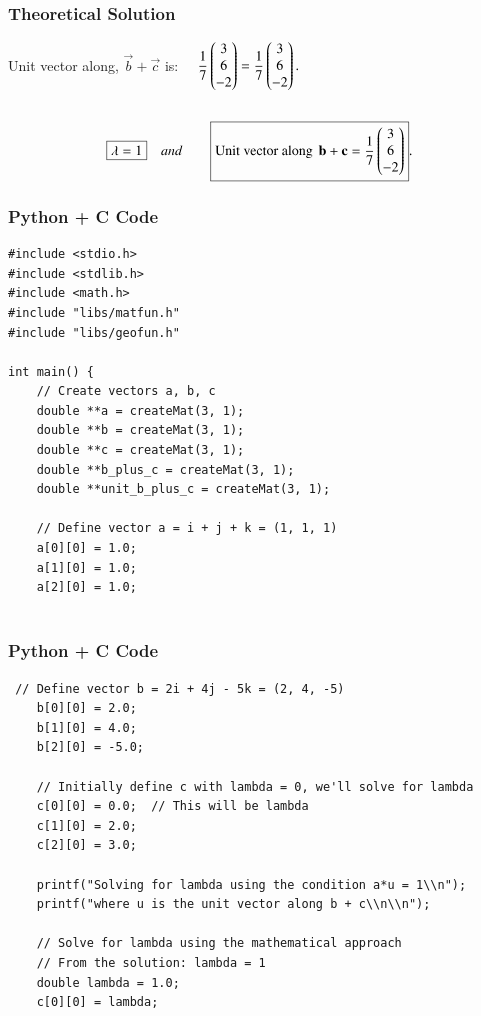 \documentclass{beamer}
\begin{document}
\begin{frame}[fragile]
    \frametitle{Theoretical Solution}

Unit vector along, $\vec{b}+\vec{c}$ is: $\quad \dfrac{1}{7}\begin{pmatrix}3\\6\\-2\end{pmatrix}
= \dfrac{1}{7}\begin{pmatrix}3\\6\\-2\end{pmatrix}.$\\\\
\bigskip
\begin{align}   
\centering
\boxed{\lambda=1} \quad and \qquad 
\boxed{\text{Unit vector along }\,\vec{b}+\vec{c}
=\dfrac{1}{7}\myvec{3\\6\\-2}}.
\end{align}

\end{frame}


\begin{frame}[fragile]
    \frametitle{Python + C Code}
    \begin{lstlisting}
#include <stdio.h>
#include <stdlib.h>
#include <math.h>
#include "libs/matfun.h"
#include "libs/geofun.h"

int main() {
    // Create vectors a, b, c
    double **a = createMat(3, 1);
    double **b = createMat(3, 1);
    double **c = createMat(3, 1);
    double **b_plus_c = createMat(3, 1);
    double **unit_b_plus_c = createMat(3, 1);
    
    // Define vector a = i + j + k = (1, 1, 1)
    a[0][0] = 1.0;
    a[1][0] = 1.0;
    a[2][0] = 1.0;
    
    \end{lstlisting}
\end{frame}


\begin{frame}[fragile]
    \frametitle{Python + C Code}
    \begin{lstlisting}
 // Define vector b = 2i + 4j - 5k = (2, 4, -5)
    b[0][0] = 2.0;
    b[1][0] = 4.0;
    b[2][0] = -5.0;
    
    // Initially define c with lambda = 0, we'll solve for lambda
    c[0][0] = 0.0;  // This will be lambda
    c[1][0] = 2.0;
    c[2][0] = 3.0;
    
    printf("Solving for lambda using the condition a*u = 1\\n");
    printf("where u is the unit vector along b + c\\n\\n");
    
    // Solve for lambda using the mathematical approach
    // From the solution: lambda = 1
    double lambda = 1.0;
    c[0][0] = lambda;
    
    \end{lstlisting}
\end{frame}
\end{document}
